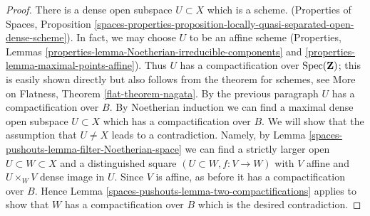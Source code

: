 \begin{proof}
\medskip\noindent
There is a dense open subspace $U \subset X$ which is a scheme.
(Properties of Spaces, Proposition
\ref{spaces-properties-proposition-locally-quasi-separated-open-dense-scheme}).
In fact, we may choose $U$ to be an affine scheme
(Properties, Lemmas \ref{properties-lemma-Noetherian-irreducible-components}
and \ref{properties-lemma-maximal-points-affine}).
Thus $U$ has a compactification over $\operatorname{Spec}(\mathbf{Z})$;
this is easily shown directly but also follows from the
theorem for schemes, see
More on Flatness, Theorem \ref{flat-theorem-nagata}.
By the previous paragraph $U$ has a compactification over $B$.
By Noetherian induction we can find a maximal dense open subspace
$U \subset X$ which has a compactification over $B$. We will show
that the assumption that $U \not = X$ leads to a contradiction.
Namely, by Lemma \ref{spaces-pushouts-lemma-filter-Noetherian-space}
we can find a strictly larger open $U \subset W \subset X$
and a distinguished square $(U \subset W, f : V \to W)$
with $V$ affine and $U \times_W V$ dense image in $U$.
Since $V$ is affine, as before it has a compactification over $B$. Hence
Lemma \ref{spaces-pushouts-lemma-two-compactifications}
applies to show that $W$ has a compactification over $B$
which is the desired contradiction.
\end{proof}



